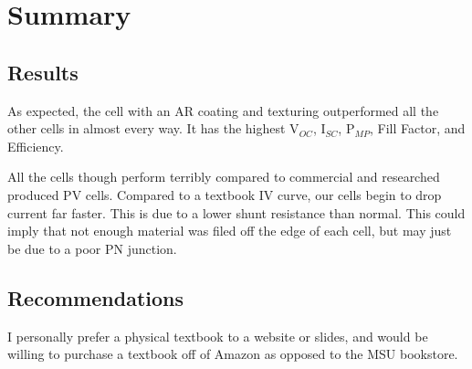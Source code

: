 \documentclass[letter,12pt]{article}
\begin{document}
\FloatBarrier
\section{Summary}
	\subsection{Results}
		As expected, the cell with an AR coating and texturing outperformed all the other cells in almost every way.  It has the highest V$_{OC}$, I$_{SC}$, P$_{MP}$, Fill Factor, and Efficiency.
		
		All the cells though perform terribly compared to commercial and researched produced PV cells.  Compared to a textbook IV curve, our cells begin to drop current far faster.  This is due to a lower shunt resistance than normal. This could imply that not enough material was filed off the edge of each cell, but may just be due to a poor PN junction.
	
	\subsection{Recommendations}
		I personally prefer a physical textbook to a website or slides, and would be willing to purchase a textbook off of Amazon as opposed to the MSU bookstore.
		
\pagebreak
\printbibliography
\end{document}
